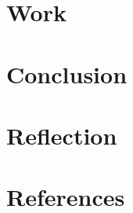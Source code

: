 \documentclass[a4paper]{article}
\begin{document}
\section{Work}

\section{Conclusion}

\section{Reflection}

\section{References}
\end{document}
